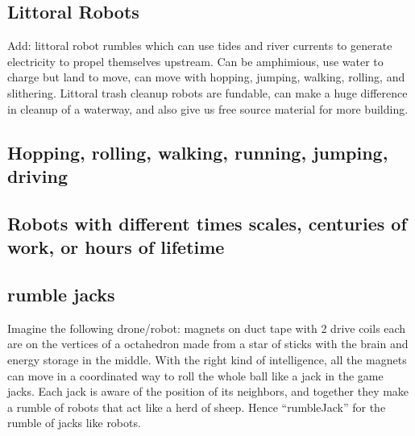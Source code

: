 \subsection{Littoral Robots}\label{littoral-robots}

Add: littoral robot rumbles which can use tides and river currents to
generate electricity to propel themselves upstream. Can be amphimious,
use water to charge but land to move, can move with hopping, jumping,
walking, rolling, and slithering. Littoral trash cleanup robots are
fundable, can make a huge difference in cleanup of a waterway, and also
give us free source material for more building.

\subsection{Hopping, rolling, walking, running, jumping,
driving}\label{hopping-rolling-walking-running-jumping-driving}

\subsection{Robots with different times scales, centuries of work, or
hours of
lifetime}\label{robots-with-different-times-scales-centuries-of-work-or-hours-of-lifetime}

\subsection{rumble jacks}\label{rumble-jacks}

Imagine the following drone/robot: magnets on duct tape with 2 drive
coils each are on the vertices of a octahedron made from a star of
sticks with the brain and energy storage in the middle. With the right
kind of intelligence, all the magnets can move in a coordinated way to
roll the whole ball like a jack in the game jacks. Each jack is aware of
the position of its neighbors, and together they make a rumble of robots
that act like a herd of sheep. Hence ``rumbleJack'' for the rumble of
jacks like robots.

